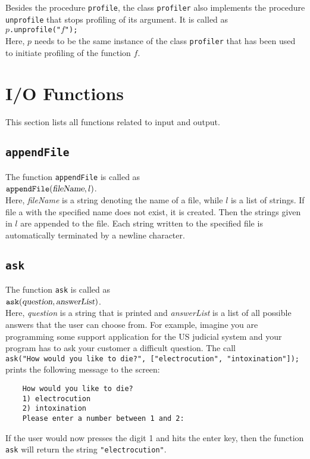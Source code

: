 Besides the procedure \texttt{profile}, the class \texttt{profiler} also implements the procedure
\texttt{unprofile} that stops profiling of its argument.  It is called as
\\[0.2cm]
\hspace*{1.3cm}
\texttt{$p$.unprofile("$f$");}
\\[0.2cm]
Here, $p$ needs to be the same instance of the class \texttt{profiler} that has been used to
initiate profiling of the function $f$. 

\section{I/O Functions}
This  section lists all functions related to input and output.

\subsection{\texttt{appendFile}}
The function \texttt{appendFile} is called as
\\[0.2cm]
\hspace*{1.3cm}
$\mathtt{appendFile}(\textsl{fileName}, l)$.
\\[0.2cm]
Here, \textsl{fileName} is a string denoting the name of a file, while $l$ is a list of
strings.  If file a with the specified name does not exist, it is created.  Then the strings
given in $l$ are appended to the file.   Each string written to the specified file is
automatically  terminated by a newline character.

\subsection{\texttt{ask}}
The function \texttt{ask} is called as
\\[0.2cm]
\hspace*{1.3cm}
$\mathtt{ask(\textsl{question}, \textsl{answerList})}$.
\\[0.2cm]
Here, \textsl{question} is a string that is printed and \textsl{answerList} is a list of all
possible answers that the user can choose from.  For example, imagine you are programming some
support application for the US judicial system and your program has to ask your customer a difficult
question.  The call
\\[0.2cm]
\hspace*{1.3cm}
\texttt{ask("How would you like to die?", ["electrocution", "intoxination"]);}
\\[0.2cm]
prints the following message to the screen:
\begin{verbatim}
    How would you like to die?
    1) electrocution
    2) intoxination
    Please enter a number between 1 and 2: 
\end{verbatim} 
If the user would now presses the digit 1 and hits the enter key, then the function \texttt{ask} will
return the string \texttt{"electrocution"}.

